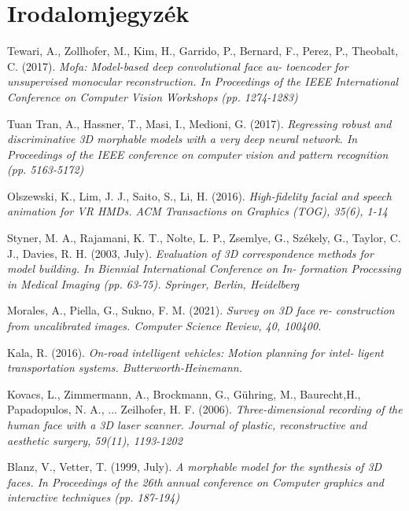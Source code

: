 \documentclass[12pt,a4]{article}
\begin{document}
    \section{Irodalomjegyzék}
	\renewcommand{\refname}{Hivatkozások}
	\begin{thebibliography}{9}
		
		Tewari, A., Zollhofer, M., Kim, H., Garrido, P., Bernard, F., Perez,
		P., Theobalt, C. (2017).
		\textit{Mofa: Model-based deep convolutional face au-
		toencoder for unsupervised monocular reconstruction. In Proceedings of
		the IEEE International Conference on Computer Vision Workshops (pp.
		1274-1283)}
		
		Tuan Tran, A., Hassner, T., Masi, I., Medioni, G. (2017). 
		\textit{Regressing
		robust and discriminative 3D morphable models with a very deep neural
		network. In Proceedings of the IEEE conference on computer vision and
		pattern recognition (pp. 5163-5172)}
		
		Olszewski, K., Lim, J. J., Saito, S., Li, H. (2016).
		\textit{High-fidelity facial and
		speech animation for VR HMDs. ACM Transactions on Graphics (TOG),
		35(6), 1-14}
		
		Styner, M. A., Rajamani, K. T., Nolte, L. P., Zsemlye, G., Székely, G.,
		Taylor, C. J., Davies, R. H. (2003, July).
		\textit{ Evaluation of 3D correspondence
		methods for model building. In Biennial International Conference on In-
		formation Processing in Medical Imaging (pp. 63-75). Springer, Berlin,
		Heidelberg}
		
		Morales, A., Piella, G., Sukno, F. M. (2021). 
		\textit{Survey on 3D face re-
		construction from uncalibrated images. Computer Science Review, 40,
		100400.}
		
		Kala, R. (2016).
		\textit{On-road intelligent vehicles: Motion planning for intel-
		ligent transportation systems. Butterworth-Heinemann.}	
		
		Kovacs, L., Zimmermann, A., Brockmann, G., Gühring, M., Baurecht,H., Papadopulos, N. A., ... Zeilhofer, H. F. (2006).
		\textit{Three-dimensional
		recording of the human face with a 3D laser scanner. Journal of plastic,
		reconstructive and aesthetic surgery, 59(11), 1193-1202}
		
		Blanz, V., Vetter, T. (1999, July).
		\textit{A morphable model for the synthesis
		of 3D faces. In Proceedings of the 26th annual conference on Computer
		graphics and interactive techniques (pp. 187-194)}
		

\end{thebibliography}
\end{document}
